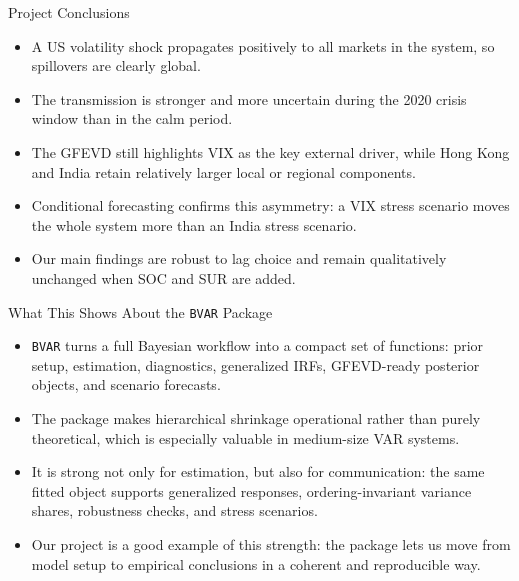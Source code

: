 \documentclass[10pt, aspectratio=169]{beamer}
\begin{document}
\begin{frame}{Project Conclusions}
\small
\begin{itemize}
  \item A US volatility shock propagates positively to all markets in the system, so spillovers are clearly global.
  \item The transmission is stronger and more uncertain during the 2020 crisis window than in the calm period.
  \item The GFEVD still highlights VIX as the key external driver, while Hong Kong and India retain relatively larger local or regional components.
  \item Conditional forecasting confirms this asymmetry: a VIX stress scenario moves the whole system more than an India stress scenario.
  \item Our main findings are robust to lag choice and remain qualitatively unchanged when SOC and SUR are added.
\end{itemize}
\end{frame}

\begin{frame}{What This Shows About the \texttt{BVAR} Package}
\small
\begin{itemize}
  \item \texttt{BVAR} turns a full Bayesian workflow into a compact set of functions: prior setup, estimation, diagnostics, generalized IRFs, GFEVD-ready posterior objects, and scenario forecasts.
  \item The package makes hierarchical shrinkage operational rather than purely theoretical, which is especially valuable in medium-size VAR systems.
  \item It is strong not only for estimation, but also for communication: the same fitted object supports generalized responses, ordering-invariant variance shares, robustness checks, and stress scenarios.
  \item Our project is a good example of this strength: the package lets us move from model setup to empirical conclusions in a coherent and reproducible way.
\end{itemize}
\end{frame}

\appendix
\end{document}
